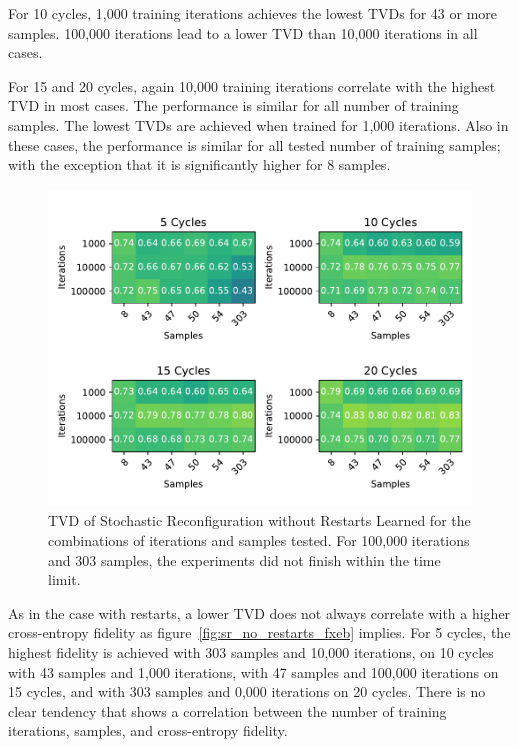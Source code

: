 For 10 cycles, 1,000 training iterations achieves the lowest TVDs for 43 or more samples. 
100,000 iterations lead to a lower TVD than 10,000 iterations in all cases. 

For 15 and 20 cycles, again 10,000 training iterations correlate with the highest TVD in most cases.
The performance is similar for all number of training samples. The lowest TVDs are achieved when trained for 1,000
iterations. Also in these cases, the performance is similar for all tested number of training samples; with 
the exception that it is significantly higher for 8 samples.

\begin{figure}[H]
  \centering
  \includegraphics[width=\textwidth]{figures/results/SR-no-restarts-learned/tvd_heatmap.pdf}
  \caption[TVD of Stochastic Reconfiguration without Restarts Learned]{TVD of Stochastic 
  Reconfiguration without Restarts Learned for the combinations of iterations and samples tested.
  For 100,000 iterations and 303 samples, the experiments did not finish within the time limit.}
  \label{fig:sr_no_restarts_tvd}
\end{figure}

As in the case with restarts, a lower TVD does not always correlate with a higher cross-entropy fidelity as 
figure~\ref{fig:sr_no_restarts_fxeb}
implies. For 5 cycles, the highest fidelity is achieved with 303 samples and 10,000 iterations, on 10 cycles 
with 43 samples and 1,000 iterations, with 47 samples and 100,000 iterations on 15 cycles, and with 303 samples and 
0,000 iterations on 20 cycles. There is no clear tendency that shows a correlation between 
the number of training iterations, samples, and cross-entropy fidelity.


